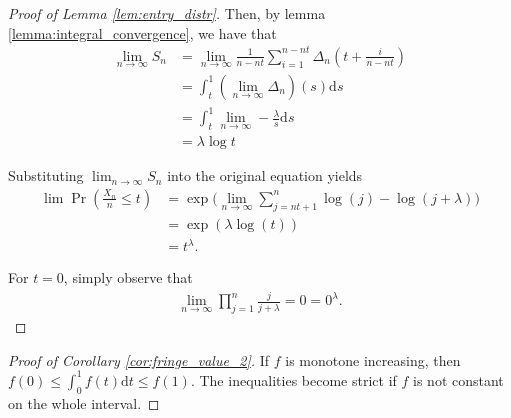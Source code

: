 \documentclass[a4paper]{article}
\newcommand{\dt}{\mathrm{d}t}
\newcommand{\ds}{\mathrm{d}s}
\begin{document}
\begin{proof}[Proof of Lemma \ref{lem:entry_distr}]
    Then, by lemma \ref{lemma:integral_convergence}, we have that
    \begin{align*}
        \lim_{n \to \infty} S_n &= \lim_{n \to \infty} \frac{1}{n-nt} \sum_{i=1}^{n-nt} \Delta_n \left( t + \frac{i}{n - nt} \right) \\
        &= \int_t^1 (\lim_{n \to \infty} \Delta_n)(s) \ds \\
        &= \int_t^1 \lim_{n \to \infty} -\frac{\lambda}{s} \ds \\
        &= \lambda \log{t}
    \end{align*}

    Substituting $\lim_{n \to \infty} S_n$ into the original equation yields
    \begin{align*}
        \lim \Pr \left( \frac{X_n}{n} \leq t \right) &= \exp \Bigg( \lim_{n \to \infty} \sum_{j = nt + 1}^n \log(j) - \log(j+\lambda) \Bigg) \\
        &= \exp(\lambda \log(t)) \\
        &= t^\lambda.
    \end{align*}

    For $t=0$, simply observe that %
    \begin{align*}
        \lim_{n \to \infty} \prod_{j = 1}^n \frac{j}{j + \lambda} = 0 = 0^\lambda.
    \end{align*}
\end{proof}

\begin{proof}[Proof of Corollary \ref{cor:fringe_value_2}]
    If $f$ is monotone increasing, then $f(0) \leq \int_0^1 f(t) \dt \leq f(1)$.
    The inequalities become strict if $f$ is not constant on the whole interval.
\end{proof}
\end{document}
